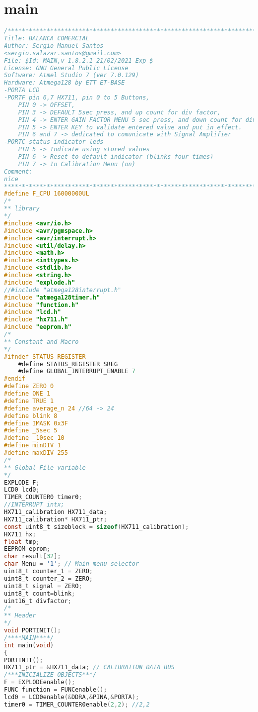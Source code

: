 \chapter{main}
\begin{lstlisting}[language=C, caption={main.c}, label=main-c, captionpos=b]
/************************************************************************
Title: BALANCA COMERCIAL
Author: Sergio Manuel Santos
<sergio.salazar.santos@gmail.com>
File: $Id: MAIN,v 1.8.2.1 21/02/2021 Exp $
License: GNU General Public License
Software: Atmel Studio 7 (ver 7.0.129)
Hardware: Atmega128 by ETT ET-BASE
-PORTA LCD
-PORTF pin 6,7 HX711, pin 0 to 5 Buttons, 
	PIN 0 -> OFFSET, 
	PIN 3 -> DEFAULT 5sec press, and up count for div factor, 
	PIN 4 -> ENTER GAIN FACTOR MENU 5 sec press, and down count for div factor, 
	PIN 5 -> ENTER KEY to validate entered value and put in effect.
	PIN 6 and 7 -> dedicated to comunicate with Signal Amplifier
-PORTC status indicator leds
	PIN 5 -> Indicate using stored values
	PIN 6 -> Reset to default indicator (blinks four times)
	PIN 7 -> In Calibration Menu (on)
Comment:
nice
************************************************************************/
#define F_CPU 16000000UL
/*
** library
*/
#include <avr/io.h>
#include <avr/pgmspace.h>
#include <avr/interrupt.h>
#include <util/delay.h>
#include <math.h>
#include <inttypes.h>
#include <stdlib.h>
#include <string.h>
#include "explode.h"
//#include "atmega128interrupt.h"
#include "atmega128timer.h"
#include "function.h"
#include "lcd.h"
#include "hx711.h"
#include "eeprom.h"
/*
** Constant and Macro
*/
#ifndef STATUS_REGISTER
	#define STATUS_REGISTER SREG
	#define GLOBAL_INTERRUPT_ENABLE 7
#endif
#define ZERO 0
#define ONE 1
#define TRUE 1
#define average_n 24 //64 -> 24
#define blink 8
#define IMASK 0x3F
#define _5sec 5
#define _10sec 10
#define minDIV 1
#define maxDIV 255
/*
** Global File variable
*/
EXPLODE F;
LCD0 lcd0;
TIMER_COUNTER0 timer0;
//INTERRUPT intx;
HX711_calibration HX711_data;
HX711_calibration* HX711_ptr;
const uint8_t sizeblock = sizeof(HX711_calibration);
HX711 hx;
float tmp;
EEPROM eprom;
char result[32];
char Menu = '1'; // Main menu selector
uint8_t counter_1 = ZERO;
uint8_t counter_2 = ZERO;
uint8_t signal = ZERO;
uint8_t count=blink;
uint16_t divfactor;
/*
** Header
*/
void PORTINIT();
/****MAIN****/
int main(void)
{
PORTINIT();
HX711_ptr = &HX711_data; // CALIBRATION DATA BUS
/***INICIALIZE OBJECTS***/
F = EXPLODEenable();
FUNC function = FUNCenable();
lcd0 = LCD0enable(&DDRA,&PINA,&PORTA);
timer0 = TIMER_COUNTER0enable(2,2); //2,2

\end{lstlisting}
